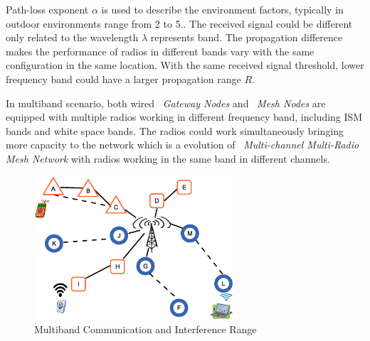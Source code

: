 Path-loss exponent \emph{$\alpha$} is used to describe the environment factors, typically in outdoor environments range from 2 to 5.\cite{camp2006measurement}. 
The received signal could be different only related to the wavelength $\lambda$ represents band. 
The propagation difference makes the performance of radios in different bands vary with the same configuration in the same location. With the same received signal threshold, lower frequency band could have a larger propagation range $R$.

In multiband scenario, both wired ~\emph{Gateway Nodes} and ~\emph{Mesh Nodes} are equipped with multiple radios working in different frequency band, including ISM bands and white space bands. The radios could work simultaneously bringing more capacity to the network which is a evolution of ~\emph{Multi-channel Multi-Radio Mesh Network} with radios working in the same band in different channels.

\begin{figure}                                                                                                                     
\centering
\includegraphics[width=74mm]{figures/interferencerange}
\vspace{-0.1in}
\caption{Multiband Communication and Interference Range}
\label{fig:interferencerange}
\end{figure}


